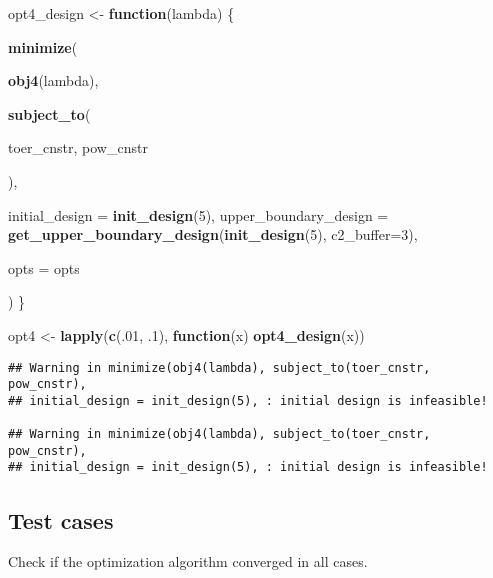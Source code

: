 \documentclass[]{book}
\newenvironment{Shaded}{\begin{snugshade}}{\end{snugshade}}
\newcommand{\ControlFlowTok}[1]{\textcolor[rgb]{0.13,0.29,0.53}{\textbf{#1}}}
\newcommand{\DataTypeTok}[1]{\textcolor[rgb]{0.13,0.29,0.53}{#1}}
\newcommand{\DecValTok}[1]{\textcolor[rgb]{0.00,0.00,0.81}{#1}}
\newcommand{\FloatTok}[1]{\textcolor[rgb]{0.00,0.00,0.81}{#1}}
\newcommand{\KeywordTok}[1]{\textcolor[rgb]{0.13,0.29,0.53}{\textbf{#1}}}
\newcommand{\NormalTok}[1]{#1}
\newcommand{\OperatorTok}[1]{\textcolor[rgb]{0.81,0.36,0.00}{\textbf{#1}}}
\newcommand{\StringTok}[1]{\textcolor[rgb]{0.31,0.60,0.02}{#1}}
\begin{document}
\begin{Shaded}
\begin{Highlighting}[]
\NormalTok{opt4_design <-}\StringTok{ }\ControlFlowTok{function}\NormalTok{(lambda) \{}

    \KeywordTok{minimize}\NormalTok{(}
        
        \KeywordTok{obj4}\NormalTok{(lambda),}
        
        \KeywordTok{subject_to}\NormalTok{(}
            
\NormalTok{            toer_cnstr,}
\NormalTok{            pow_cnstr}

\NormalTok{        ),}
        
        \DataTypeTok{initial_design =} \KeywordTok{init_design}\NormalTok{(}\DecValTok{5}\NormalTok{),}
        \DataTypeTok{upper_boundary_design =} \KeywordTok{get_upper_boundary_design}\NormalTok{(}\KeywordTok{init_design}\NormalTok{(}\DecValTok{5}\NormalTok{), }\DataTypeTok{c2_buffer=}\DecValTok{3}\NormalTok{),}
        
        \DataTypeTok{opts =}\NormalTok{ opts}
        
\NormalTok{)}
\NormalTok{\}}

\NormalTok{opt4 <-}\StringTok{ }\KeywordTok{lapply}\NormalTok{(}\KeywordTok{c}\NormalTok{(.}\DecValTok{01}\NormalTok{, }\FloatTok{.1}\NormalTok{), }\ControlFlowTok{function}\NormalTok{(x) }\KeywordTok{opt4_design}\NormalTok{(x))}
\end{Highlighting}
\end{Shaded}

\begin{verbatim}
## Warning in minimize(obj4(lambda), subject_to(toer_cnstr, pow_cnstr),
## initial_design = init_design(5), : initial design is infeasible!

## Warning in minimize(obj4(lambda), subject_to(toer_cnstr, pow_cnstr),
## initial_design = init_design(5), : initial design is infeasible!
\end{verbatim}

\hypertarget{test-cases-13}{%
\subsection{Test cases}\label{test-cases-13}}

Check if the optimization algorithm converged in all cases.

\begin{Shaded}
\end{Shaded}
\end{document}
